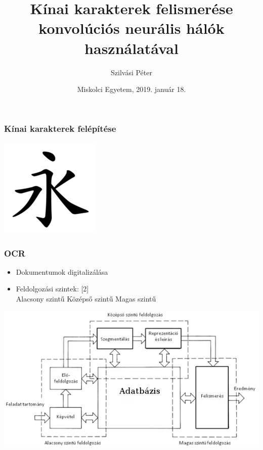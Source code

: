 \documentclass{beamer}
\newcommand\tab[1][1cm]{\hspace*{#1}}
\begin{document}

\title[Kínai karakterek felismerése, konvolúciós ANN]{
{\Large Kínai karakterek felismerése konvolúciós neurális
hálók használatával}
}
\author[Szilvási Péter]{\Large Szilvási Péter}
\date{Miskolci Egyetem, 2019. január 18.}

\frame{\titlepage}

\begin{frame}[fragile]
\frametitle{Kínai karakterek felépítése}

\includegraphics[scale=0.6, center]{vonasrend}

\end{frame}

\begin{frame}[fragile]
\frametitle{OCR}

\begin{itemize}
\item Dokumentumok digitalizálása
\item Feldolgozási szintek: [2]\\
	Alacsony szintű \tab Középső szintű \tab Magas szintű
\end{itemize}

\includegraphics[scale=0.45, center]{ocr}



\end{frame}
\end{document}
